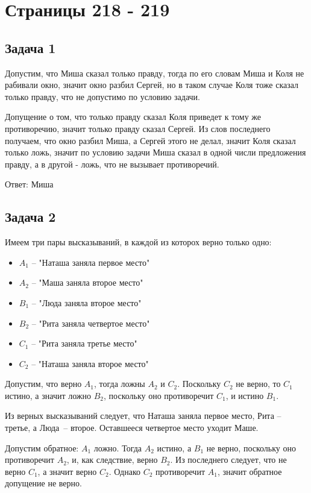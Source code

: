 \section{Страницы 218 - 219}

\subsection{Задача 1}
Допустим, что Миша сказал только правду, тогда по его словам Миша и Коля не рабивали 
окно, значит окно разбил Сергей, но в таком случае Коля тоже сказал только правду,
что не допустимо по условию задачи.

Допущение о том, что только правду сказал Коля приведет к тому же противоречию,
значит только правду сказал Сергей. Из слов последнего получаем, что окно разбил 
Миша, а Сергей этого не делал, значит Коля сказал только ложь, значит по условию задачи
Миша сказал в одной числи предложения правду, а в другой - ложь, что не вызывает противоречий.

Ответ: Миша

\subsection{Задача 2}
Имеем три пары высказываний, в каждой из которох верно только одно:

\begin{itemize}
  \item $ A_1 $ -- "Наташа заняла первое место"
  \item $ A_2 $ -- "Маша заняла второе место"
  \item $ B_1 $ -- "Люда заняла второе место"
  \item $ B_2 $ -- "Рита заняла четвертое место"
  \item $ C_1 $ -- "Рита заняла третье место"
  \item $ C_2 $ -- "Наташа заняла второе место"
\end{itemize}

Допустим, что верно $ A_1 $, тогда ложны $ A_2 $ и $ C_2 $. Поскольку $ C_2 $ не верно,
то $ C_1 $ истино, а значит ложно $ B_2 $, поскольку оно противоречит $ C_1 $, и истино $ B_1 $.

Из верных высказываний следует, что Наташа заняла первое место, Рита -- третье,
а Люда~-- второе. Оставшееся четвертое место уходит Маше.

Допустим обратное: $ A_1 $ ложно. Тогда $ A_2 $ истино, а $ B_1 $ не верно, 
поскольку оно противоречит $ A_2 $, и, как следствие, верно $ B_2 $. Из последнего 
следует, что не верно $ C_1 $, а значит верно $ C_2 $.  Однако $ C_2 $ 
противоречит $ A_1 $, значит обратное допущение не верно.

